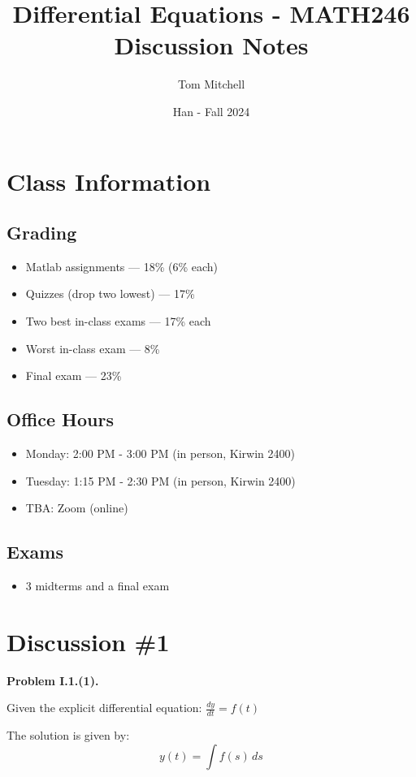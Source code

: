 \documentclass{article}
\title{Differential Equations - MATH246 Discussion Notes}
\author{Tom Mitchell}
\date{Han - Fall 2024}
\begin{document}
\maketitle

\section*{Class Information}

\subsection*{Grading}
\begin{itemize}
    \item Matlab assignments — 18\% (6\% each)
    \item Quizzes (drop two lowest) — 17\%
    \item Two best in-class exams — 17\% each
    \item Worst in-class exam — 8\%
    \item Final exam — 23\%
\end{itemize}

\subsection*{Office Hours}
\begin{itemize}
    \item Monday: 2:00 PM - 3:00 PM (in person, Kirwin 2400)
    \item Tuesday: 1:15 PM - 2:30 PM (in person, Kirwin 2400)
    \item TBA: Zoom (online)
\end{itemize}

\subsection*{Exams}
\begin{itemize}
    \item 3 midterms and a final exam
\end{itemize}

\section*{Discussion \#1}

\textbf{Problem I.1.(1).}

Given the explicit differential equation: \(\frac{dy}{dt} = f(t)\)

The solution is given by: 
\[
y(t) = \int f(s) \, ds
\]
\end{document}

